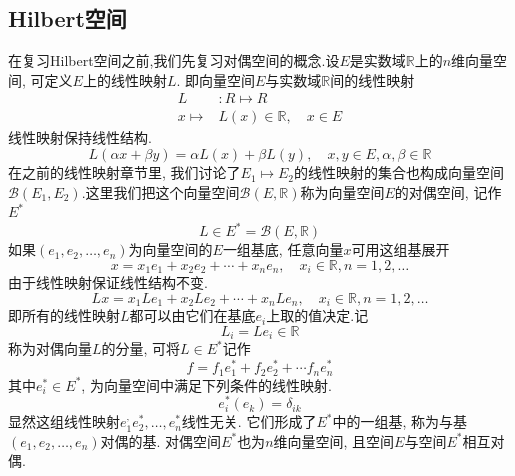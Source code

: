 \documentclass[a4paper,11pt]{article}
\begin{document}
\subsection{Hilbert空间}\label{Hilbert Space}
在复习Hilbert空间之前,我们先复习对偶空间的概念.设$E$是实数域$\mathbb{R}$上的$n$维向量空间, 可定义$E$上的线性映射$L$. 即向量空间$E$与实数域$\mathbb{R}$间的线性映射
\begin{equation*}
\begin{split}
   L&:R\mapsto R \\
     x\mapsto&L(x)\in \mathbb{R},\quad x\in E
\end{split}
\end{equation*}
线性映射保持线性结构.
\begin{equation*}
  L(\alpha x+\beta y)=\alpha L(x)+\beta L(y),\quad x,y\in E,\alpha,\beta\in\mathbb{R}
\end{equation*}
在之前的线性映射章节里, 我们讨论了$E_1\mapsto E_2$的线性映射的集合也构成向量空间$\mathcal{B}(E_1,E_2)$.这里我们把这个向量空间$\mathcal{B}(E,\mathbb{R})$称为向量空间$E$的对偶空间, 记作$E^*$
\begin{equation*}
  L\in E^*=\mathcal{B}(E,\mathbb{R})
\end{equation*}
如果$(e_1,e_2,\dots,e_n)$为向量空间的$E$一组基底, 任意向量$x$可用这组基展开
\begin{equation*}
  x=x_1e_1+x_2e_2+\cdots+x_ne_n, \quad x_i\in\mathbb{R},n=1,2,\dots
\end{equation*}
由于线性映射保证线性结构不变.
\begin{equation*}
  Lx=x_1Le_1+x_2Le_2+\cdots+x_nLe_n, \quad x_i\in\mathbb{R},n=1,2,\dots
\end{equation*}
即所有的线性映射$L$都可以由它们在基底$e_i$上取的值决定.记
\begin{equation*}
  L_i=Le_i\in\mathbb{R}
\end{equation*}
称为对偶向量$L$的分量, 可将$L\in E^*$记作
\begin{equation*}
  f=f_1e_1^*+f_2e_2^*+\cdots f_ne_n^*
\end{equation*}
其中$e_i^*\in E^*$, 为向量空间中满足下列条件的线性映射.
\begin{equation*}
  e_i^*(e_k)=\delta_{ik}
\end{equation*}
显然这组线性映射$e_1^,e_2^*,\dots,e_n^*$线性无关. 它们形成了$E^*$中的一组基, 称为与基$(e_1,e_2,\dots,e_n)$对偶的基. 对偶空间$E^*$也为$n$维向量空间, 且空间$E$与空间$E^*$相互对偶.
\end{document}
